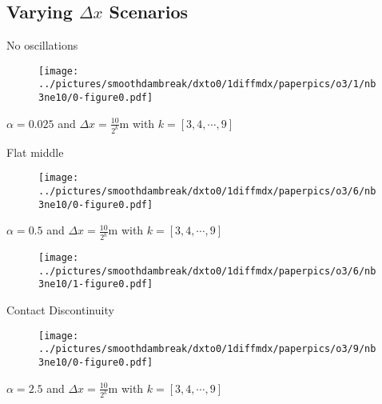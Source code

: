 \documentclass[pdf]{beamer}
\begin{document}
\subsection{Varying $\Delta x$ Scenarios}


\begin{frame}{No oscillations}
\begin{figure}
\texttt{[image: ../pictures/smoothdambreak/dxto0/1diffmdx/paperpics/o3/1/nb3ne10/0-figure0.pdf]}
\end{figure}
$\alpha = 0.025$ and $\Delta x = \frac{10}{2^k}  \text{m}$ with $k = [3,4,\cdots,9]$
\end{frame}

\begin{frame}{Flat middle}
\begin{figure}
\texttt{[image: ../pictures/smoothdambreak/dxto0/1diffmdx/paperpics/o3/6/nb3ne10/0-figure0.pdf]}
\end{figure}
$\alpha = 0.5$ and $\Delta x = \frac{10}{2^k} \text{m}$ with $k = [3,4,\cdots,9]$
\end{frame}

\begin{frame}{}
\begin{figure}
\texttt{[image: ../pictures/smoothdambreak/dxto0/1diffmdx/paperpics/o3/6/nb3ne10/1-figure0.pdf]}
\end{figure}
\cite{Hank-etal-2010-2034}
\end{frame}

\begin{frame}{Contact Discontinuity}
\begin{figure}
\texttt{[image: ../pictures/smoothdambreak/dxto0/1diffmdx/paperpics/o3/9/nb3ne10/0-figure0.pdf]}
\end{figure}
$\alpha = 2.5$ and $\Delta x = \frac{10}{2^k} \text{m}$ with $k = [3,4,\cdots,9]$
\end{frame}
\end{document}
